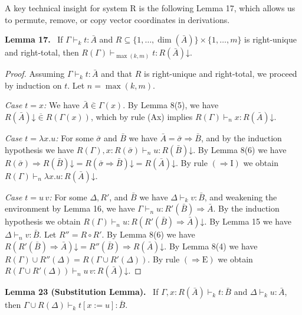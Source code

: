 \documentclass[10pt,a4paper]{article}
\newcommand{\Av}{\bar A}\newcommand{\Bv}{\bar B}\newcommand{\Cv}{\bar C}
\newcommand{\sv}{\bar\sigma}\newcommand{\tv}{\bar\tau}
\newcommand{\vin}{\mathrel{\overline{\in}}}
\newcommand{\dimn}{\operatorname{dim}}
\newcommand{\pmjudgment}[3]{#1\vdash_k #2:#3}
\newcommand{\orig}[2]{\par\medskip\noindent\textbf{#1 #2.}\ }
\begin{document}
A key technical insight for system R is the following Lemma 17, which allows us to permute, remove, or copy vector coordinates in derivations.
\orig{Lemma}{17} If $\pmjudgment\Gamma t\Av$ and $R\subseteq\{1,\ldots,\dimn(\Av)\}\times\{1,\ldots,m\}$ is right-unique and right-total, then $R(\Gamma)\vdash_{\max(k,m)}t:R(\Av)\mathord\downarrow$.
\begin{proof}
Assuming $\pmjudgment\Gamma t\Av$ and that $R$ is right-unique and right-total, we proceed by induction on $t$. Let $n=\max(k,m)$.\par
\emph{Case $t=x$:} We have $\Av\vin\Gamma(x)$. By Lemma 8(5), we have $R(\Av)\mathord\downarrow\vin R(\Gamma(x))$, which by rule (Ax) implies $R(\Gamma)\vdash_n x:R(\Av)\mathord\downarrow$.\par
\emph{Case $t=\lambda x.u$:} For some $\sv$ and $\Bv$ we have $\Av=\sv\Rightarrow\Bv$, and by the induction hypothesis we have $R(\Gamma),x:R(\sv)\vdash_n u:R(\Bv)\mathord\downarrow$. By Lemma 8(6) we have $R(\sv)\Rightarrow R(\Bv)\mathord\downarrow=R(\sv\Rightarrow\Bv)\mathord\downarrow=R(\Av)\mathord\downarrow$. By rule $(\Rightarrow\mathrm I)$ we obtain $R(\Gamma)\vdash_n\lambda x.u:R(\Av)\mathord\downarrow$.\par
\emph{Case $t=u\,v$:} For some $\Delta,R'$, and $\Bv$ we have $\pmjudgment\Delta v\Bv$, and weakening the environment by Lemma 16, we have $\Gamma\vdash_n u:R'(\Bv)\Rightarrow\Av$. By the induction hypothesis we obtain $R(\Gamma)\vdash_n u:R(R'(\Bv)\Rightarrow\Av)\mathord\downarrow$. By Lemma 15 we have $\Delta\vdash_n v:\Bv$. Let $R''=R\circ R'$. By Lemma 8(6) we have $R(R'(\Bv)\Rightarrow\Av)\mathord\downarrow=R''(\Bv)\Rightarrow R(\Av)\mathord\downarrow$. By Lemma 8(4) we have $R(\Gamma)\cup R''(\Delta)=R(\Gamma\cup R'(\Delta))$. By rule $(\Rightarrow\mathrm E)$ we obtain $R(\Gamma\cup R'(\Delta))\vdash_n u\,v:R(\Av)\mathord\downarrow$.
\end{proof}
\orig{Lemma}{23 (Substitution Lemma)} If $\pmjudgment{\Gamma,x:R(\Av)}t\Bv$ and $\pmjudgment\Delta u\Av$, then $\pmjudgment{\Gamma\cup R(\Delta)}{t[x:=u]}\Bv$.
\end{document}
